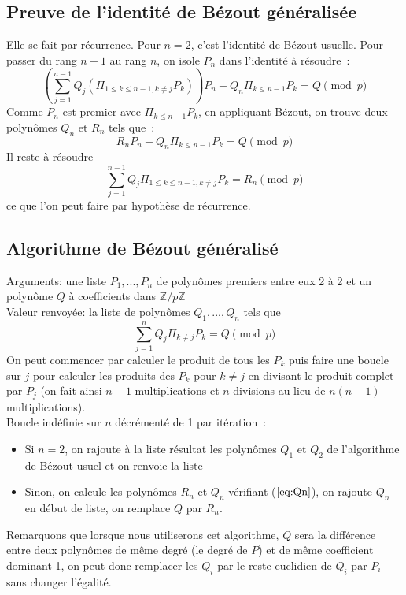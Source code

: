 \documentclass[a4paper,11pt]{article}
\begin{document}
\begin{giacjshere}
\subsection{Preuve de l'identité de Bézout généralisée}
Elle se fait par récurrence. Pour $n=2$, c'est l'identité de Bézout usuelle. 
Pour passer
du rang $n-1$ au rang $n$, on isole $P_n$ dans l'identité à résoudre~:
\[ \left( 
\sum_{j=1}^{n-1} Q_j (\Pi_{1 \leq k \leq n-1,k\neq j} P_k) \right) P_n + 
Q_n \Pi_{k\leq n-1} P_k =Q \pmod p\]
Comme $P_n$ est premier avec $\Pi_{k\leq n-1} P_k$, en appliquant Bézout,
on trouve deux polynômes $Q_n$ et $R_n$ tels que~:
\begin{equation} \label{eq:Qn}
 R_n P_n + Q_n \Pi_{k\leq n-1} P_k =Q \pmod p 
\end{equation}
Il reste à résoudre
\[ \sum_{j=1}^{n-1} Q_j \Pi_{1 \leq k \leq n-1,k\neq j} P_k=R_n \pmod p\]
ce que l'on peut faire par hypothèse de récurrence.

\subsection{Algorithme de Bézout généralisé}
Arguments: une liste $P_1,...,P_n$ de polynômes premiers entre eux 2 à 2  
et un polynôme $Q$ à coefficients dans $\mathbb{Z}/p\mathbb{Z}$\\
Valeur renvoyée: la liste de polynômes $Q_1,...,Q_n$ tels que
\[ \sum_{j=1}^n Q_j \Pi_{k\neq j} P_k=Q \pmod p \]
On peut commencer par calculer le produit de tous les $P_k$ puis faire une 
boucle sur $j$ pour calculer les produits des $P_k$ pour $k\neq j$ en divisant
le produit complet par $P_j$ (on fait ainsi $n-1$ multiplications et
$n$ divisions au lieu de $n(n-1)$ multiplications).\\
Boucle indéfinie sur $n$ décrémenté de 1 par itération~:
\begin{itemize}
\item Si $n=2$, on rajoute à la liste résultat les polynômes 
$Q_1$ et $Q_2$ de l'algorithme de Bézout usuel et on renvoie la liste
\item Sinon, on calcule les polynômes $R_n$ et $Q_n$ vérifiant (\(\ref{eq:Qn}\)),
on rajoute $Q_n$ en début de liste, on remplace $Q$ par $R_n$.
\end{itemize}
Remarquons que lorsque nous utiliserons cet algorithme, $Q$ sera la différence
entre deux polynômes de même degré (le degré de $P$) et de même coefficient
dominant 1, on peut donc
remplacer les $Q_i$ par le reste euclidien de $Q_i$ par $P_i$ sans
changer l'égalité.



\end{giacjshere}
\end{document}
